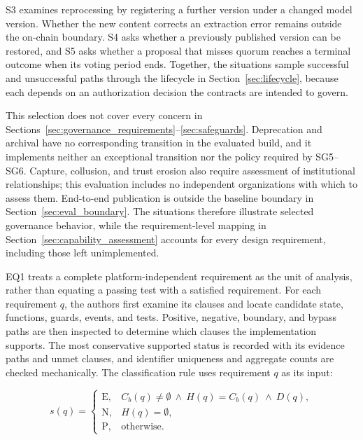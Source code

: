 \documentclass[journal]{IEEEtran}
\begin{document}
S3 examines reprocessing by registering a further version under a
changed model version. Whether the new content corrects an extraction
error remains outside the on-chain boundary. S4 asks whether a previously
published version can be restored, and S5 asks whether a proposal that
misses quorum reaches a terminal outcome when its voting period ends.
Together, the situations sample successful and unsuccessful paths through
the lifecycle in Section~\ref{sec:lifecycle}, because each depends on
an authorization decision the contracts are intended to govern.

This selection does not cover every concern in
Sections~\ref{sec:governance_requirements}--\ref{sec:safeguards}.
Deprecation and archival have no corresponding transition in the evaluated
build, and it implements neither an exceptional transition nor the policy
required by SG5--SG6. Capture, collusion, and trust erosion also require
assessment of institutional relationships; this evaluation includes no
independent organizations with which to assess them. End-to-end publication
is outside the baseline boundary in Section~\ref{sec:eval_boundary}.
The situations therefore illustrate selected governance behavior, while
the requirement-level mapping in Section~\ref{sec:capability_assessment}
accounts for every design requirement, including those left unimplemented.

EQ1 treats a complete platform-independent requirement as the unit of
analysis, rather than equating a passing test with a satisfied requirement.
For each requirement $q$, the authors first examine its clauses and locate
candidate state, functions, guards, events, and tests. Positive, negative,
boundary, and bypass paths are then inspected to determine which clauses
the implementation supports. The most conservative supported status is
recorded with its evidence paths and unmet clauses, and identifier
uniqueness and aggregate counts are checked mechanically.
The classification rule uses requirement $q$ as its input:

\begin{equation}
\label{eq:coverage_status}
s(q)=
\begin{cases}
\mathrm{E}, & C_b(q)\neq\emptyset\ \land\ H(q)=C_b(q)\ \land\ D(q),\\
\mathrm{N}, & H(q)=\emptyset,\\
\mathrm{P}, & \text{otherwise}.
\end{cases}
\end{equation}
\end{document}
